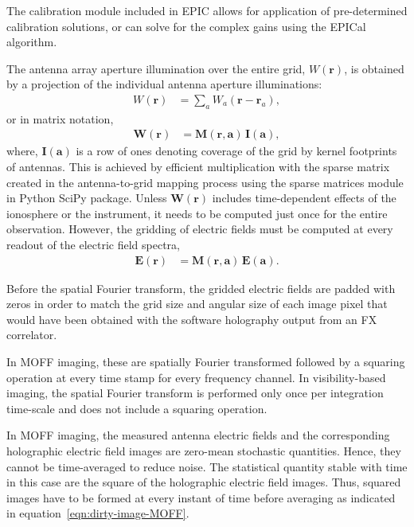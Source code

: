 \documentclass[a4paper,fleqn,usenatbib]{mnras}
\begin{document}
The calibration module included in EPIC allows for application of pre-determined 
calibration solutions, or can solve for the complex gains using the EPICal 
algorithm.

\par\medskip
{}
\par\medskip
\noindent The antenna array aperture illumination over the entire grid, $W(\mathbf{r})$, is obtained by a projection of the individual antenna aperture illuminations:
\begin{align}\label{eqn:gridding-convolution}
  W(\mathbf{r}) &= \sum_a W_a(\mathbf{r}-\mathbf{r}_a),
\end{align}
or in matrix notation,
\begin{align}
  \mathbf{W}(\mathbf{r}) &= \mathbf{M}(\mathbf{r},\mathbf{a})\,\mathbf{I}(\mathbf{a}),
\end{align}
where, $\mathbf{I}(\mathbf{a})$ is a row of ones denoting coverage of the grid by kernel footprints of antennas. This is achieved by efficient multiplication with the sparse matrix created in the antenna-to-grid mapping process using the sparse matrices module in Python SciPy package. Unless $\mathbf{W}(\mathbf{r})$ includes time-dependent effects of the ionosphere or the instrument, it needs to be computed just once for the entire observation. However, the gridding of electric fields must be computed at every readout of the electric field spectra,
\begin{align}
  \mathbf{E}(\mathbf{r}) &= \mathbf{M}(\mathbf{r},\mathbf{a})\,\mathbf{E}(\mathbf{a}).
\end{align}

\par\medskip
{}
\par\medskip
\noindent Before the spatial Fourier transform, the gridded electric fields are 
padded with zeros in order to match the grid size and angular size of each image 
pixel that would have been obtained with the software holography output from an 
FX correlator. 

In MOFF imaging, these are spatially Fourier transformed followed by a squaring
operation at every time stamp for every frequency channel. In visibility-based 
imaging, the spatial Fourier transform is performed only once per integration 
time-scale and does not include a squaring operation.

\par\medskip
{}
\par\medskip
\noindent In MOFF imaging, the measured antenna electric fields and the 
corresponding holographic electric field images are zero-mean stochastic 
quantities. Hence, they cannot be time-averaged to reduce noise. The statistical 
quantity stable with time in this case are the square of the holographic 
electric field images. Thus, squared images have to be formed at every instant 
of time before averaging as indicated in equation~\ref{eqn:dirty-image-MOFF}.
\end{document}

